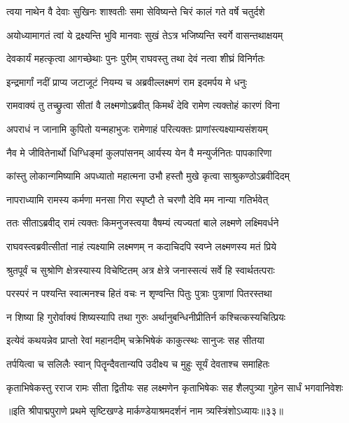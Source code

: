 \twolineshloka
{त्वया नाथेन वै देवाः सुखिनः शाश्वतीः समा}
{सेविष्यन्ते चिरं कालं गते वर्षे चतुर्दशे} %

\twolineshloka
{अयोध्यामागतं त्वां ये द्रक्ष्यन्ति भुवि मानवाः}
{सुखं तेऽत्र भजिष्यन्ति स्वर्गे वासन्तथाक्षयम्} %

\twolineshloka
{देवकार्यं महत्कृत्वा आगच्छेथाः पुनः पुरीम्}
{राघवस्तु तथा देवं नत्वा शीघ्रं विनिर्गतः} %

\twolineshloka
{इन्द्रमार्गां नदीं प्राप्य जटाजूटं नियम्य च}
{अब्रवील्लक्ष्मणं राम इदमर्पय मे धनुः} %

\twolineshloka
{रामवाक्यं तु तच्छ्रुत्वा सीतां वै लक्ष्मणोऽब्रवीत्}
{किमर्थं देवि रामेण त्यक्तोहं कारणं विना} %

\twolineshloka
{अपराधं न जानामि कुपितो यन्महाभुजः}
{रामेणाहं परित्यक्तः प्राणांस्त्यक्ष्याम्यसंशयम्} %

\twolineshloka
{नैव मे जीवितेनार्थो धिग्धिङ्मां कुलपांसनम्}
{आर्यस्य येन वै मन्युर्जनितः पापकारिणा} %

\twolineshloka
{कांस्तु लोकान्गमिष्यामि अपध्यातो महात्मना}
{उभौ हस्तौ मुखे कृत्वा साश्रुकण्ठोऽब्रवीदिदम्} %

\twolineshloka
{नापराध्यामि रामस्य कर्मणा मनसा गिरा}
{स्पृष्टौ ते चरणौ देवि मम नान्या गतिर्भवेत्} %

\twolineshloka
{ततः सीताऽब्रवीद् रामं त्यक्तः किमनुजस्त्वया}
{वैषम्यं त्यज्यतां बाले लक्ष्मणे लक्ष्मिवर्धने} %

\twolineshloka
{राघवस्त्वब्रवीत्सीतां नाहं त्यक्ष्यामि लक्ष्मणम्}
{न कदाचिदपि स्वप्ने लक्ष्मणस्य मतं प्रिये} %

\twolineshloka
{श्रुतपूर्वं च सुश्रोणि क्षेत्रस्यास्य विचेष्टितम्}
{अत्र क्षेत्रे जनास्सत्यं सर्वे हि स्वार्थतत्पराः} %

\twolineshloka
{परस्परं न पश्यन्ति स्वात्मनश्च हितं वचः}
{न शृण्वन्ति पितुः पुत्राः पुत्राणां पितरस्तथा} %

\twolineshloka
{न शिष्या हि गुरोर्वाक्यं शिष्यस्यापि तथा गुरुः}
{अर्थानुबन्धिनीप्रीतिर्न कश्चित्कस्यचित्प्रियः} %

\twolineshloka
{इत्येवं कथयन्नेव प्राप्तो रेवां महानदीम्}
{चक्रेभिषेकं काकुत्स्थः सानुजः सह सीतया} %

\twolineshloka
{तर्पयित्वा च सलिलैः स्वान् पितॄन्दैवतान्यपि}
{उदीक्ष्य च मुहुः सूर्यं देवताश्च समाहितः} %

\twolineshloka
{कृताभिषेकस्तु रराज रामः सीता द्वितीयः सह लक्ष्मणेन}
{कृताभिषेकः सह शैलपुत्र्या गुहेन सार्धं भगवानिवेशः} %

॥इति श्रीपाद्मपुराणे प्रथमे सृष्टिखण्डे मार्कण्डेयाश्रमदर्शनं नाम त्र्यस्त्रिंशोऽध्यायः॥३३॥